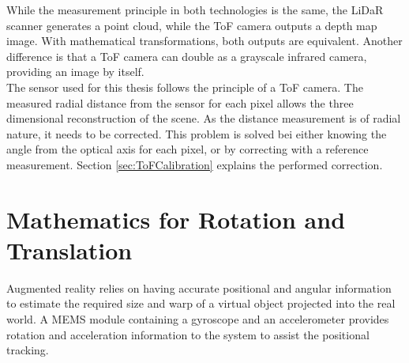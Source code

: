 While the measurement principle in both technologies is the same, the LiDaR scanner generates a point cloud, while the ToF camera outputs a depth map image. With mathematical transformations, both outputs are equivalent. Another difference is that a ToF camera can double as a grayscale infrared camera, providing an image by itself. \\
The sensor used for this thesis follows the principle of a ToF camera. The measured radial distance from the sensor for each pixel allows the three dimensional reconstruction of the scene. As the distance measurement is of radial nature, it needs to be corrected. This problem is solved bei either knowing the angle from the optical axis for each pixel, or by correcting with a reference measurement. Section \ref{sec:ToFCalibration} explains the performed correction.

\section{Mathematics for Rotation and Translation}
\label{sec:LinAlgRotation}
Augmented reality relies on having accurate positional and angular information to estimate the required size and warp of a virtual object projected into the real world. A MEMS module containing a gyroscope and an accelerometer provides rotation and acceleration information to the system to assist the positional tracking.

